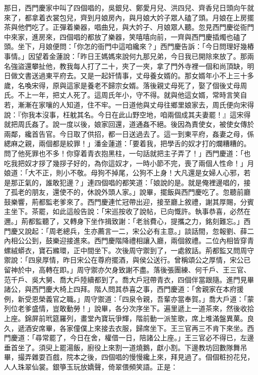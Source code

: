 那日，西門慶家中叫了四個唱的，吳銀兒、鄭愛月兒、洪四兒、齊香兒日頭向午就來了，都拿着衣裳包兒，齊到月娘房內，與月娘大妗子眾人磕了頭。月娘在上房擺茶與他們吃了。正彈着樂器，唱曲兒，與大妗子、月娘眾人聽。忽見西門慶從衙門中來家，進房來，四個唱的都放了樂器，笑嘻嘻向前，一齊與西門慶插燭也磕了頭。坐下，月娘便問：「你怎的衙門中這咱纔來？」西門慶告訴：「今日問理好幾樁事情。」因望着金蓮說：「昨日王媽媽來說何九那兄弟，今日我已開除來放了。那兩名強盜還攀扯他，教我每人打了二十，夾了一夾，拿了門外寺裡一個和尚頂缺，明日做文書送過東平府去。又是一起奸情事，丈母養女婿的。那女婿年小不上三十多歲，名喚宋得，原與這家是養老不歸宗女婿。落後親丈母死了，娶了個後丈母周氏。不上一年，把丈人死了。這周氏年小，守不得。就與他這女婿，常時言笑自若，漸漸在家嚷的人知道，住不牢。一日道他與丈母往鄉里娘家去，周氏便向宋得說：『你我本沒事，枉躭其名。今日在此山野空地，咱兩個成其夫妻罷！』這宋得就把周氏姦了。說一度以後，娘家回還，道通姦不絕。後因為責使女，被使女傳於兩鄰，纔首告官。今日取了供招，都一日送過去了。這一到東平府，姦妻之母，係緦麻之親，兩個都是絞罪！」潘金蓮道：「要着我，把學舌的奴才打的爛糟糟的。問了他死罪也不多！你穿着青衣抱黑柱，一句話就把主子弄了！」西門慶道：「也吃我把奴才拶了幾拶子好的，為你這奴才，一時小節不完，喪了兩個人性命！」月娘道：「大不正，則小不敬。母狗不掉尾，公狗不上身！大凡還是女婦人心邪，若是那正氣的，誰敢犯邊？」連四個唱的都笑道：「娘說的是。就是俺裡邊唱的，接了孤老的朋友，還使不的，休說外頭人家。」說畢，擺飯與西門慶吃了。忽聽前廳鼓樂響，荊都監老爹來了。西門慶連忙冠帶出迎，接至廳上敘禮，謝其厚賜，分賓主坐下。茶罷，如此這般告說：「宋巡按收了說帖，已向慨許。執事恭喜，必然在邇。」荊都監聽了，又轉身下坐作揖致謝：「老翁費心，提攜之力，銘刻難忘。」西門慶又說起：「周老總兵，生亦薦言一二，宋公必有主意。」談話間，忽報劉、薛二內相公公到，鼓樂迎接進來。西門慶階降禮相讓入廳，兩個敘禮。二位內相皆穿青螺絨蟒衣，寶石縧環，正中間坐下。次後周守禦到了，一處敘話。荊都監又問周守禦說：「四泉厚情，昨日宋公在尊府擺酒，與侯公送行。曾稱頌公之厚情，宋公已留神於中，高轉在即。」周守禦亦欠身致謝不盡。落後張團練、何千戶、王三官、范千戶、吳大舅、喬大戶陸續都到了。喬大戶冠帶青衣，四個伴當跟隨。進門見畢諸公，與西門慶大椅上四拜。階人問其恭喜之事，西門慶道：「舍親家在本府援例，新受恩榮義官之職。」周守禦道：「四泉令親，吾輩亦當奉賀。」喬大戶道：「蒙列位老爹盛情，豈敢動勞！」說畢，各分次序坐下。遍里遞上一道茶來，然後收拾上座。錦屏前玳筵羅列，畫堂內寶玩爭輝，階前動一派笙歌，席上堆滿盤異菓。良久，遞酒安席畢，各家僮僕上來接去衣服，歸席坐下。王三官再三不肯下來坐。西門慶道：「尋常罷了，今日在舍，權借一日，陪諸公上座。」王三官必不得已，左邊垂首坐了。須臾上罷湯飯，廚役上來割一道燒鵝，獻小割。下邊教坊回數隊舞吊畢，撮弄雜耍百戲，院本之後，四個唱的慢慢纔上來，拜見過了。個個粧扮花兒，人人珠翠仙裳。銀箏玉玩放嬌聲，倚翠偎頻笑語。正是：

